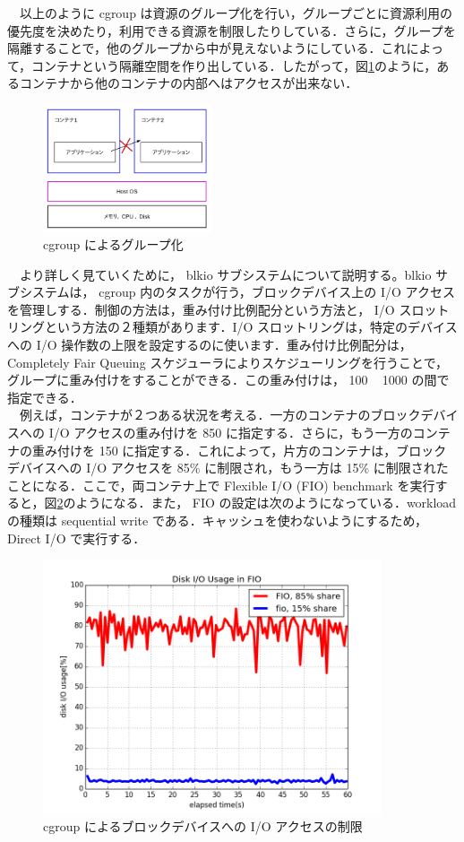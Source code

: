 \documentclass[graduation-thesis]{jsarticle}
\begin{document}
　以上のように cgroup は資源のグループ化を行い，グループごとに資源利用の優先度を決めたり，利用できる資源を制限したりしている．さらに，グループを隔離することで，他のグループから中が見えないようにしている．これによって，コンテナという隔離空間を作り出している．したがって，図\ref{fig:grouping}のように，あるコンテナから他のコンテナの内部へはアクセスが出来ない．\\
\begin{figure}[H]
	\begin{center}
		\includegraphics[width=5.0cm, clip]{images/kakuri.pdf}
		\caption{cgroup によるグループ化}
		\label{fig:grouping}
	\end{center}
\end{figure}
　より詳しく見ていくために， blkio サブシステムについて説明する。blkio サブシステムは， cgroup 内のタスクが行う，ブロックデバイス上の I/O アクセスを管理しする．制御の方法は，重み付け比例配分という方法と， I/O スロットリングという方法の２種類があります．I/O スロットリングは，特定のデバイスへの I/O 操作数の上限を設定するのに使います．重み付け比例配分は， Completely Fair Queuing スケジューラによりスケジューリングを行うことで，グループに重み付けをすることができる．この重み付けは， 100 ~ 1000 の間で指定できる．\\
　例えば，コンテナが２つある状況を考える．一方のコンテナのブロックデバイスへの I/O アクセスの重み付けを 850 に指定する．さらに，もう一方のコンテナの重み付けを 150 に指定する．これによって，片方のコンテナは，ブロックデバイスへの I/O アクセスを 85\% に制限され，もう一方は 15\% に制限されたことになる．ここで，両コンテナ上で Flexible I/O (FIO) benchmark を実行すると，図\ref{fig:blkio}のようになる．また， FIO の設定は次のようになっている．workload の種類は sequential write である．キャッシュを使わないようにするため， Direct I/O で実行する．\\
\begin{figure}[H]
	\begin{center}
		\includegraphics[width=10.0cm]{images/FiguresForGraduation/fio_nofsync85.png}
		\caption{cgroup によるブロックデバイスへの I/O アクセスの制限}
		\label{fig:blkio}
	\end{center}
\end{figure}
\end{document}
